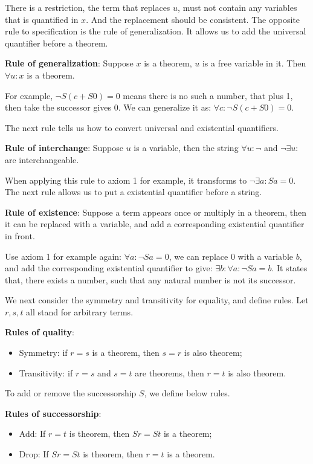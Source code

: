 \documentclass[b5paper]{article}
\begin{document}
There is a restriction, the term that replaces $u$, must not contain any variables that is quantified in $x$. And the replacement should be consistent. The opposite rule to specification is the rule of generalization. It allows us to add the universal quantifier before a theorem.

\textbf{Rule of generalization}: Suppose $x$ is a theorem, $u$ is a free variable in it. Then $\forall u: x$ is a theorem.

For example, $\lnot S(c + S0) = 0$ means there is no such a number, that plus 1, then take the successor gives 0. We can generalize it as: $\forall c: \lnot S(c + S0) = 0$.

The next rule tells us how to convert universal and existential quantifiers.

\textbf{Rule of interchange}: Suppose $u$ is a variable, then the string $\forall u: \lnot $ and $\lnot \exists u:$ are interchangeable.

When applying this rule to axiom 1 for example, it transforms to $\lnot \exists a: Sa = 0$. The next rule allows us to put a existential quantifier before a string.

\textbf{Rule of existence}: Suppose a term appears once or multiply in a theorem, then it can be replaced with a variable, and add a corresponding existential quantifier in front.

Use axiom 1 for example again: $\forall a: \lnot Sa = 0$, we can replace 0 with a variable $b$, and add the corresponding existential quantifier to give: $\exists b: \forall a: \lnot Sa = b$. It states that, there exists a number, such that any natural number is not its successor.

We next consider the symmetry and transitivity for equality, and define rules. Let $r, s, t$ all stand for arbitrary terms.

\textbf{Rules of quality}:
\begin{itemize}
\item Symmetry: if $r = s$ is a theorem, then $s = r$ is also theorem;
\item Transitivity: if $r = s$ and $s = t$ are theorems, then $r = t$ is also theorem.
\end{itemize}

To add or remove the successorship $S$, we define below rules.

\textbf{Rules of successorship}:
\begin{itemize}
\item Add: If $r = t$ is theorem, then $Sr = St$ is a theorem;
\item Drop: If $Sr = St$ is theorem, then $r = t$ is a theorem.
\end{itemize}
\end{document}

